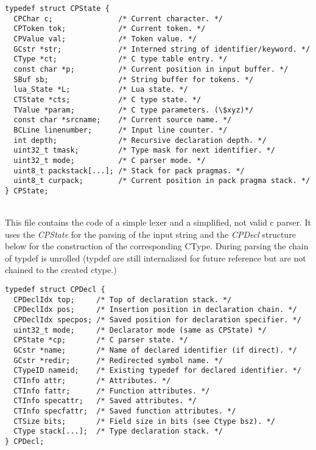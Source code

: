 \begin{adjustbox}{bgcolor=backgroundColour, max width=\textwidth}
\begin{lstlisting}[style=CStyle]
typedef struct CPState {
  CPChar c;               /* Current character. */
  CPToken tok;            /* Current token. */
  CPValue val;            /* Token value. */
  GCstr *str;             /* Interned string of identifier/keyword. */
  CType *ct;              /* C type table entry. */
  const char *p;          /* Current position in input buffer. */
  SBuf sb;                /* String buffer for tokens. */
  lua_State *L;           /* Lua state. */
  CTState *cts;           /* C type state. */
  TValue *param;          /* C type parameters. (\$xyz)*/
  const char *srcname;    /* Current source name. */
  BCLine linenumber;      /* Input line counter. */
  int depth;              /* Recursive declaration depth. */
  uint32_t tmask;         /* Type mask for next identifier. */
  uint32_t mode;          /* C parser mode. */
  uint8_t packstack[...]; /* Stack for pack pragmas. */
  uint8_t curpack;        /* Current position in pack pragma stack. */
} CPState;
\end{lstlisting}
\end{adjustbox}

\\
This file contains the code of a simple lexer and a simplified, not valid c
parser. It uses the \emph{CPState} for the parsing of the input
string and the \emph{CPDecl} structure below for the construction of the
corresponding CType. During parsing the chain of typdef is unrolled (typdef are
still internalized for future reference but are not chained to the created
ctype.)

\begin{lstlisting}[style=CStyle]
typedef struct CPDecl {
  CPDeclIdx top;     /* Top of declaration stack. */
  CPDeclIdx pos;     /* Insertion position in declaration chain. */
  CPDeclIdx specpos; /* Saved position for declaration specifier. */
  uint32_t mode;     /* Declarator mode (same as CPState) */
  CPState *cp;       /* C parser state. */
  GCstr *name;       /* Name of declared identifier (if direct). */
  GCstr *redir;      /* Redirected symbol name. */
  CTypeID nameid;    /* Existing typedef for declared identifier. */
  CTInfo attr;       /* Attributes. */
  CTInfo fattr;      /* Function attributes. */
  CTInfo specattr;   /* Saved attributes. */
  CTInfo specfattr;  /* Saved function attributes. */
  CTSize bits;       /* Field size in bits (see Ctype bsz). */
  CType stack[...];  /* Type declaration stack. */
} CPDecl;
\end{lstlisting}

